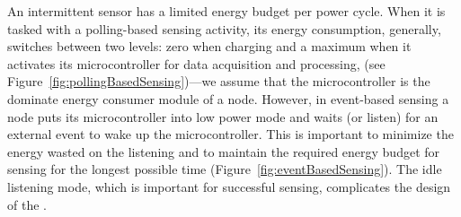 %
An intermittent sensor has a limited energy budget per power cycle. When it is tasked with a polling-based sensing activity, its energy consumption, generally, switches between two levels: zero when charging and a maximum when it activates its microcontroller  for data acquisition and processing, (see Figure~\ref{fig:pollingBasedSensing})---we assume that the microcontroller is the dominate energy consumer module of a node. However, in event-based sensing  a node puts its microcontroller into low power mode and waits (or listen) for an external event to wake up the microcontroller. This is important to minimize the energy wasted on the listening and to maintain the required energy budget for sensing for the longest possible time (Figure~\ref{fig:eventBasedSensing}). The idle listening mode, which is important for successful sensing, complicates the design of the \sys.

